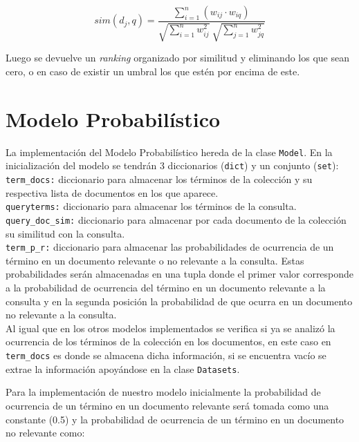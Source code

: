 \documentclass[spanish]{article}
\begin{document}
		\begin{equation}
			\displaystyle sim \left(d_j, q \right) = \displaystyle \frac{\displaystyle\sum_{i=1}^n (w_{ij} \cdot w_{iq})}{\sqrt{\displaystyle\sum_{i=1}^n w_{ij}^2} \ \sqrt{\displaystyle\sum_{j=1}^n w_{jq}^2}}
		\end{equation}

		Luego se devuelve un \emph{ranking} organizado por similitud y eliminando los que sean cero, o en caso de existir un umbral los que estén por encima de este.

		\section*{Modelo Probabilístico}

			La implementación del Modelo Probabilístico hereda de la clase \texttt{Model}. En la inicialización del modelo se tendrán 3 diccionarios (\texttt{dict}) y un conjunto (\texttt{set}): \\

			\texttt{term\_docs:} diccionario para almacenar los términos de la colección y su respectiva lista de documentos en los que aparece.\\

			\texttt{queryterms:} diccionario para almacenar los términos de la consulta.\\

			\texttt{query\_doc\_sim:} diccionario para almacenar por cada documento de la colección su similitud con la consulta.\\

			\texttt{term\_p\_r:} diccionario para almacenar las probabilidades de ocurrencia de un término en un documento relevante o no relevante a la consulta. Estas probabilidades serán almacenadas en una tupla donde el primer valor corresponde a la probabilidad de ocurrencia del término en un documento relevante a la consulta y en la segunda posición la probabilidad de que ocurra en un documento no relevante a la consulta.\\

			Al igual que en los otros modelos implementados se verifica si ya se analizó la ocurrencia de los términos de la colección en los documentos, en este caso en \texttt{term\_docs} es donde se almacena dicha información, si se encuentra vacío se extrae la información apoyándose en la clase \texttt{Datasets}.

			Para la implementación de nuestro modelo inicialmente la probabilidad de ocurrencia de un término en un documento relevante será tomada como una constante (0.5) y la probabilidad de ocurrencia de un término en un documento no relevante como:
\end{document}
